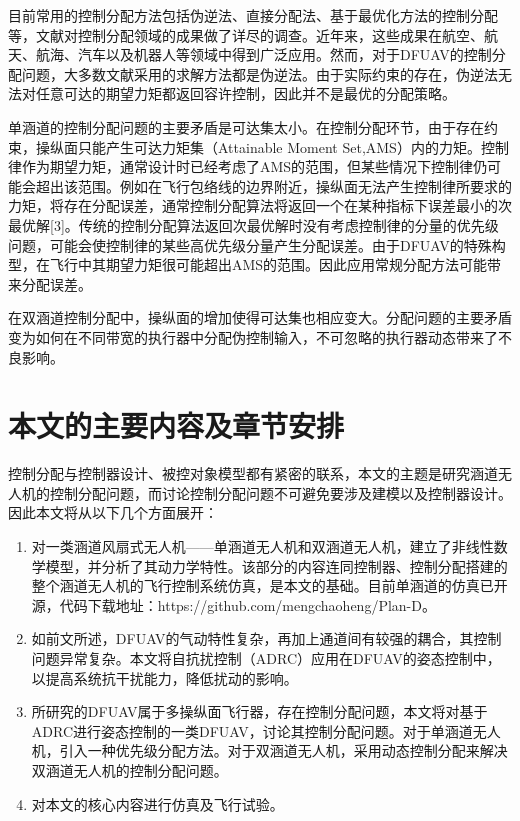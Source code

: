 目前常用的控制分配方法包括伪逆法\cite{Golub_2012,Horn_2012}、直接分配法\cite{Durham_1993}、基于最优化方法的控制分配\cite{JohnA.M.Petersen_2005,Harkegard_2002}等，文献\parencite{Johansen_2013}对控制分配领域的成果做了详尽的调查。近年来，这些成果在航空\cite{Yan_2020}、航天\cite{Li_2018}、航海\cite{Garus_2017}、汽车\cite{Schwartz_2019}以及机器人\cite{Barthelmes_2017}等领域中得到广泛应用。然而，对于DFUAV的控制分配问题，大多数文献采用的求解方法都是伪逆法\cite{Pflimlin_2007a,Zhao_2015,Peddle_2009}。由于实际约束的存在，伪逆法无法对任意可达的期望力矩都返回容许控制\cite{Durham_2017}，因此并不是最优的分配策略。

单涵道的控制分配问题的主要矛盾是可达集太小。在控制分配环节，由于存在约束，操纵面只能产生可达力矩集（Attainable Moment Set,AMS）内的力矩。控制律作为期望力矩，通常设计时已经考虑了AMS的范围，但某些情况下控制律仍可能会超出该范围。例如在飞行包络线的边界附近，操纵面无法产生控制律所要求的力矩，将存在分配误差，通常控制分配算法将返回一个在某种指标下误差最小的次最优解[3]。传统的控制分配算法返回次最优解时没有考虑控制律的分量的优先级问题，可能会使控制律的某些高优先级分量产生分配误差。由于DFUAV的特殊构型，在飞行中其期望力矩很可能超出AMS的范围。因此应用常规分配方法可能带来分配误差。

在双涵道控制分配中，操纵面的增加使得可达集也相应变大。分配问题的主要矛盾变为如何在不同带宽的执行器中分配伪控制输入，不可忽略的执行器动态带来了不良影响。
\section{本文的主要内容及章节安排}
控制分配与控制器设计、被控对象模型都有紧密的联系，本文的主题是研究涵道无人机的控制分配问题，而讨论控制分配问题不可避免要涉及建模以及控制器设计。因此本文将从以下几个方面展开：
\begin{enumerate}
	\item 	对一类涵道风扇式无人机——单涵道无人机和双涵道无人机，建立了非线性数学模型，并分析了其动力学特性。该部分的内容连同控制器、控制分配搭建的整个涵道无人机的飞行控制系统仿真，是本文的基础。目前单涵道的仿真已开源，代码下载地址：https://github.com/mengchaoheng/Plan-D。
	\item	如前文所述，DFUAV的气动特性复杂，再加上通道间有较强的耦合，其控制问题异常复杂。本文将自抗扰控制（ADRC）应用在DFUAV的姿态控制中，以提高系统抗干扰能力，降低扰动的影响。
	\item	所研究的DFUAV属于多操纵面飞行器，存在控制分配问题，本文将对基于ADRC进行姿态控制的一类DFUAV，讨论其控制分配问题。对于单涵道无人机，引入一种优先级分配方法。对于双涵道无人机，采用动态控制分配来解决双涵道无人机的控制分配问题。
	\item	对本文的核心内容进行仿真及飞行试验。	
\end{enumerate}

